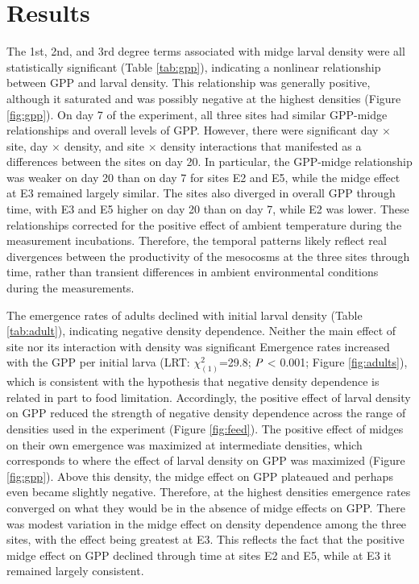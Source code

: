 

\section*{Results}
 
The 1st, 2nd, and 3rd degree terms associated with midge larval density
were all statistically significant (Table \ref{tab:gpp}), 
indicating a nonlinear relationship between GPP and larval density.
This relationship was generally positive, 
although it saturated 
and was possibly negative at the highest densities (Figure \ref{fig:gpp}).
On day 7 of the experiment, 
all three sites had similar GPP-midge relationships and overall levels of GPP.
However, there were significant day $\times$ site, day $\times$ density,
and site $\times$ density interactions that manifested as a differences
between the sites on day 20.
In particular, the GPP-midge relationship was weaker on day 20 than on day 7 for sites
E2 and E5, while the midge effect at E3 remained largely similar.
The sites also diverged in overall GPP through time,
with E3 and E5 higher on day 20 than on day 7,
while E2 was lower.
These relationships corrected for the positive effect of ambient temperature during the 
measurement incubations.
Therefore, the temporal patterns likely reflect real divergences 
between the productivity of the mesocosms at the three sites through time, 
rather than transient differences in ambient environmental conditions during the measurements.

The emergence rates of adults declined with initial larval density 
(Table \ref{tab:adult}), 
indicating negative density dependence.
Neither the main effect of site nor its interaction with density was significant
Emergence rates increased with the GPP per initial larva 
(LRT: $\chi^2_{(1)}$=29.8; $\emph{P}$ < 0.001; Figure \ref{fig:adults}),
which is consistent with the hypothesis that negative density dependence is 
related in part to food limitation.
Accordingly, the positive effect of larval density on GPP reduced the strength of 
negative density dependence across the range of densities 
used in the experiment (Figure \ref{fig:feed}).
The positive effect of midges on their own emergence was maximized at intermediate
densities, 
which corresponds to where the effect of larval density on GPP was maximized 
(Figure \ref{fig:gpp}).
Above this density, 
the midge effect on GPP plateaued and perhaps even became slightly negative. 
Therefore, at the highest densities emergence rates converged on what they would be 
in the absence of midge effects on GPP. 
There was modest variation in the midge effect on density dependence among the three sites,
with the effect being greatest at E3.
This reflects the fact that the positive midge effect on GPP declined through time
at sites E2 and E5, while at E3 it remained largely consistent. 

